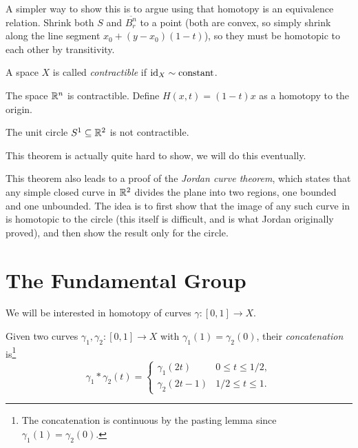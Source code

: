 \begin{remark}
  A simpler way to show this is to argue using that
  homotopy is an equivalence relation. Shrink both
  $S$ and $\overline{B_r^n}$ to a point (both
  are convex, so simply shrink along the line segment
  $x_0 + (y - x_0)(1 - t)$), so they must be
  homotopic to each other by transitivity.
\end{remark}

\begin{definition}
  A space $X$ is called \emph{contractible} if
  $\operatorname{id}_X \sim \text{constant}$.
\end{definition}

\begin{example}
  The space $\mathbb{R}^n$ is contractible. Define
  $H(x, t) = (1 - t) x$ as a homotopy to the origin.
\end{example}

\begin{theorem}
  The unit circle $S^1 \subseteq \mathbb{R}^2$ is not
  contractible.
\end{theorem}

\begin{remark}
  This theorem
  is actually quite hard to show, we will do
  this eventually.
\end{remark}

\begin{remark}
  This theorem also leads to a
  proof of the \emph{Jordan curve theorem}, which
  states that any simple closed curve in $\mathbb{R}^2$
  divides the plane into two regions, one bounded
  and one unbounded. The idea is to first
  show that the
  image of any such curve in is
  homotopic to the circle (this itself is
  difficult, and is what Jordan originally proved),
  and then show the result only for the circle.
\end{remark}

\section{The Fundamental Group}
\begin{remark}
  We will be interested in homotopy of curves
  $\gamma : [0, 1] \to X$.
\end{remark}

\begin{definition}
  Given two curves $\gamma_1, \gamma_2 : [0, 1] \to X$
  with $\gamma_1(1) = \gamma_2(0)$, their
  \emph{concatenation} is\footnote{The concatenation is continuous by the pasting lemma since $\gamma_1(1) = \gamma_2(0)$.}
  \[
  \gamma_1 * \gamma_2(t) = \begin{cases}
    \gamma_1(2t) & 0 \le t \le 1/2, \\
    \gamma_2(2t - 1) & 1/2 \le t \le 1.
  \end{cases}
  \]
\end{definition}

